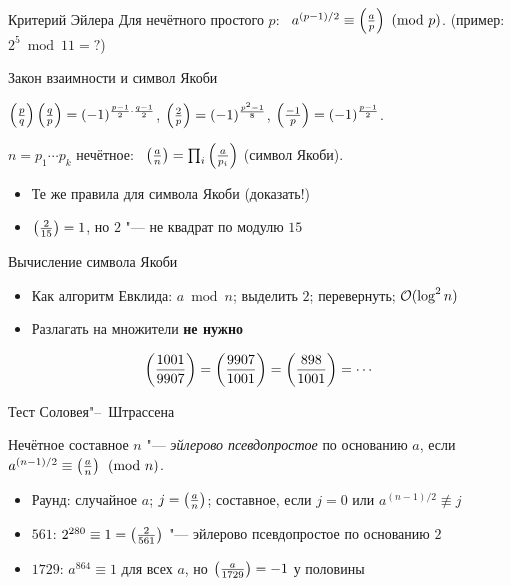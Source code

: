 \documentclass{ca-slides}
\begin{document}
\begin{theoremframe}{Критерий Эйлера}
  Для нечётного простого $p$: \ $a^{(p-1)/2} \equiv \left(\frac{a}{p}\right)\ (\mathrm{mod}\ p)$.
  \hfill\small (пример: $2^5 \bmod 11 = ?$)
\end{theoremframe}

\begin{canvasframe}{Закон взаимности и символ Якоби}
  \small
  \begin{theorem}
    $\left(\frac{p}{q}\right)\left(\frac{q}{p}\right) = (-1)^{\frac{p-1}{2}\cdot\frac{q-1}{2}}$, \quad
    $\left(\frac{2}{p}\right) = (-1)^{\frac{p^2-1}{8}}$, \quad $\left(\frac{-1}{p}\right) = (-1)^{\frac{p-1}{2}}$.
  \end{theorem}
  \begin{definition}
    $n = p_1 \cdots p_k$ нечётное: \ $\left(\frac{a}{n}\right) = \prod_i \left(\frac{a}{p_i}\right)$ (символ Якоби).
  \end{definition}
  \begin{itemize}
    \item Те же правила для символа Якоби (доказать!)
    \item $\left(\frac{2}{15}\right) = 1$, но $2$ "--- не квадрат по модулю $15$
  \end{itemize}
\end{canvasframe}

\begin{canvasframe}{Вычисление символа Якоби}
  \begin{itemize}
    \item Как алгоритм Евклида: $a \bmod n$; выделить $2$; перевернуть; $\mathcal{O}(\log^2 n)$
    \item Разлагать на множители \textbf{не нужно}
  \end{itemize}
  \[
    \left(\frac{1001}{9907}\right) = \left(\frac{9907}{1001}\right) = \left(\frac{898}{1001}\right) = \cdots
  \]
  \penspace[0.4\textheight]
\end{canvasframe}

\begin{canvasframe}{Тест Соловея"--~Штрассена}
  \begin{definition}
    Нечётное составное $n$ "--- \emph{эйлерово псевдопростое} по основанию $a$, если
    $a^{(n-1)/2} \equiv \left(\frac{a}{n}\right) \pmod n$.
  \end{definition}
  \begin{itemize}
    \item Раунд: случайное $a$; $j = \left(\frac{a}{n}\right)$; составное, если $j = 0$ или
      $a^{(n-1)/2} \not\equiv j$
    \item $561$: $2^{280} \equiv 1 = \left(\frac{2}{561}\right)$ "--- эйлерово псевдопростое по основанию $2$
    \item $1729$: $a^{864} \equiv 1$ для всех $a$, но $\left(\frac{a}{1729}\right) = -1$ у половины
  \end{itemize}
  \notearea[0.2\textheight]
\end{canvasframe}
\end{document}
